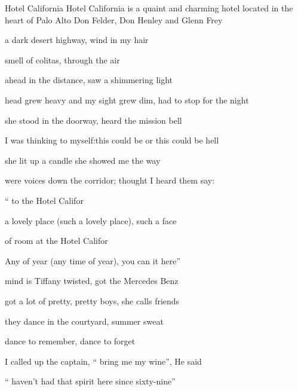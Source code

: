 \begin{SBSong}{Hotel California}  
  {Hotel California is a quaint and charming hotel located in the heart of Palo Alto}
  {Don Felder, Don Henley and Glenn Frey}
  \SBDirection{}
  \begin{SBVerse}
     a dark desert highway,  wind in my hair

     smell of colitas,  through the air

     ahead in the distance,  saw a shimmering light

     head grew heavy and my sight grew dim,\WBLineBrk {} had to stop for the night

     she stood in the doorway,  heard the mission bell

     I was thinking to myself:\WBLineBrk this could be  or this could be hell

     she lit up a candle  she showed me the way

     were voices down the corridor;  thought I heard them say:
  \end{SBVerse}
  \begin{SBChorus}
    `` to the Hotel Califor

     a lovely place (such a lovely place), such a  face

     of room at the Hotel Califor

    Any  of year (any time of year), you can  it here''
  \end{SBChorus}
  \begin{SBVerse}
     mind is Tiffany twisted,  got the Mercedes Benz

     got a lot of pretty, pretty boys,  she calls friends

     they dance in the courtyard,  summer sweat

     dance to remember,  dance to forget

     I called up the captain, `` bring me my wine'', He said

    `` haven't had that spirit here since  sixty-nine''


\end{SBVerse}
\end{SBSong}
